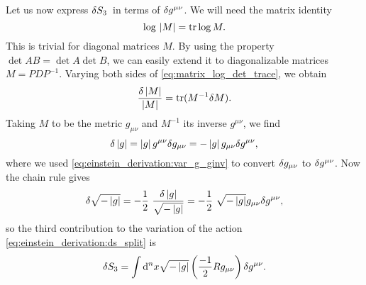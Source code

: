 Let us now express $\delta S_3$ in terms of $\delta g^{\mu \nu}$.
We will need the matrix identity
\begin{equation}
	\log \, \left\lvert M \right\rvert = \text{tr} \log M  .
	\label{eq:matrix_log_det_trace}
\end{equation}
This is trivial for diagonal matrices $M$.
By using the property $\det{AB} = \det{A} \det{B}$, we can easily extend it to diagonalizable matrices $M = P D P^{-1}$.
Varying both sides of \cref{eq:matrix_log_det_trace}, we obtain \cite{ref:matrix_ln_det_tr_exercise}
\begin{equation}
	\frac{\delta \left\lvert M \right\rvert}{\left\lvert M \right\rvert} = \text{tr} (M^{-1} \delta M) .
\end{equation}
Taking $M$ to be the metric $g_{\mu \nu}$ and $M^{-1}$ its inverse $g^{\mu \nu}$, we find
\begin{equation}
	\delta \left\lvert g \right\rvert = \left\lvert g \right\rvert g^{\mu \nu} \delta g_{\mu \nu} = -\left\lvert g \right\rvert g_{\mu \nu} \delta g^{\mu \nu} ,
\end{equation}
where we used \cref{eq:einstein_derivation:var_g_ginv} to convert $\delta g_{\mu \nu}$ to $\delta g^{\mu \nu}$.
Now the chain rule gives
\begin{equation}
	\variation{\sqrt{-\det{g}}} = -\frac{1}{2} \frac{\variation{\det{g}}}{\sqrt{-\det{g}}} = -\frac{1}{2} \sqrt{-\det{g}} g_{\mu \nu} \variation{g^{\mu \nu}},
\end{equation}
so the third contribution to the variation of the action \eqref{eq:einstein_derivation:ds_split} is
\begin{equation}
	\delta S_3 = \int \mathop{}\!\mathrm{d}^n x \sqrt{-\left\lvert g \right\rvert} \left( \frac{-1}{2} R g_{\mu \nu} \right) \delta g^{\mu \nu} .
\end{equation}

